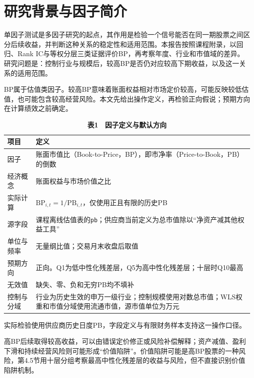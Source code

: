 \section{研究背景与因子简介}
单因子测试是多因子研究的起点，其作用是检验一个信号能否在同一期股票之间区分后续收益，并判断这种关系的稳定性和适用范围。本报告按照课程附录，以回归、Rank IC与等权分层三类证据评价BP，再考察年度、行业和市值域的差异。研究问题是：控制行业与规模后，较高BP是否仍对应较高下期收益，以及这一关系的适用范围。

BP属于估值类因子。较高BP意味着账面权益相对市场定价较高，可能反映较低估值，也可能包含较高经营风险。本文先给出操作定义，再检验正向假说；预期方向在计算绩效之前确定。

\begin{table}[H]\centering
\caption*{\textbf{表1　因子定义与默认方向}}
\small\renewcommand{\arraystretch}{1.2}
\begin{tabularx}{\linewidth}{@{}p{26mm}X@{}}\toprule
项目 & 定义 \\ \midrule
因子 & 账面市值比（Book-to-Price，BP），即市净率（Price-to-Book，PB）的倒数 \\
经济概念 & 账面权益与市场价值之比 \\
实际计算 & $\mathrm{BP}_{i,t}=1/\mathrm{PB}_{i,t}$，仅使用正且有限的历史PB \\
源字段 & 课程离线估值表的\texttt{pb}；供应商当前定义为总市值除以“净资产减其他权益工具” \\
单位与频率 & 无量纲比值；交易月末收盘后取值 \\
预期方向 & 正向。Q1为低中性化残差层，Q5为高中性化残差层；十层时Q10最高 \\
无效值 & 缺失、零、负和无穷PB均不填补 \\
控制与分域 & 行业为历史生效的申万一级行业；控制规模使用对数总市值；WLS权重和市值分域使用流通市值，源市值单位为万元 \\
\bottomrule\end{tabularx}
\end{table}

实际检验使用供应商历史日度PB，字段定义与有限财务样本支持这一操作口径。

高BP后续取得较高收益，可以由错误定价修正或风险补偿解释；资产减值、盈利下滑和持续经营风险则可能形成“价值陷阱”。价值陷阱可能是高BP股票的一种风险，第4.5节用十层分组考察最高中性化残差层的收益与风险，但不直接识别价值陷阱机制。
